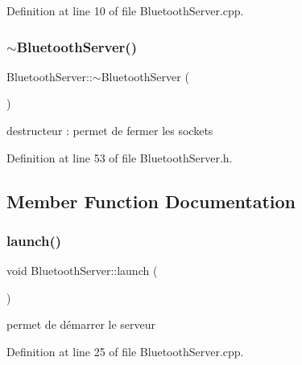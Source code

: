 Definition at line 10 of file Bluetooth\+Server.\+cpp.

\mbox{\label{class_bluetooth_server_ac664aa6e13215aacee09e560d28d5edf}} 
\subsubsection{\texorpdfstring{$\sim$\+Bluetooth\+Server()}{~BluetoothServer()}}
{\footnotesize\ttfamily Bluetooth\+Server\+::$\sim$\+Bluetooth\+Server (\begin{DoxyParamCaption}{ }\end{DoxyParamCaption})\hspace{0.3cm}{\ttfamily [inline]}}



destructeur \+: permet de fermer les sockets 



Definition at line 53 of file Bluetooth\+Server.\+h.



\subsection{Member Function Documentation}
\mbox{\label{class_bluetooth_server_a5e4e7348662fd1fd5f3aac54f2b73481}} 
\subsubsection{\texorpdfstring{launch()}{launch()}}
{\footnotesize\ttfamily void Bluetooth\+Server\+::launch (\begin{DoxyParamCaption}{ }\end{DoxyParamCaption})}



permet de démarrer le serveur 



Definition at line 25 of file Bluetooth\+Server.\+cpp.

\mbox{\label{class_bluetooth_server_a85d4d56d32b7aa99746b57784f1ebdbb}} 
